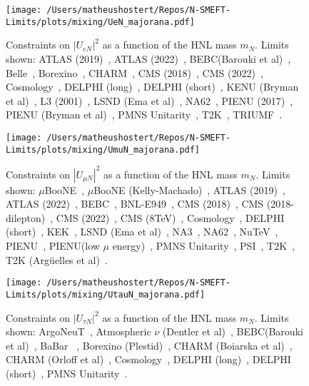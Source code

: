 \documentclass{revtex4-1}%
\begin{document}
%
\normalsize%


\begin{figure}[h!]%
\centering%
\texttt{[image: /Users/matheushostert/Repos/N-SMEFT-Limits/plots/mixing/UeN\_majorana.pdf]}%
\caption{Constraints on $|U_{e N}|^2$ as a function of the HNL mass $m_N$. Limits shown: ATLAS (2019)~\cite{ATLAS:2019kpx}, ATLAS (2022)~\cite{ATLAS:2022atq}, BEBC(Barouki et al)~\cite{Barouki:2022bkt}, Belle~\cite{Belle:2013ytx}, Borexino~\cite{Borexino:2013bot}, CHARM~\cite{CHARM:1985nku}, CMS (2018)~\cite{CMS:2018iaf}, CMS (2022)~\cite{CMS:2022fut}, Cosmology~\cite{Sabti:2020yrt}, DELPHI (long)~\cite{DELPHI:1996qcc}, DELPHI (short)~\cite{DELPHI:1996qcc}, KENU (Bryman et al)~\cite{Bryman:2019bjg}, L3 (2001)~\cite{L3:2001zfe}, LSND (Ema et al)~\cite{Ema:2023buz}, NA62~\cite{NA62:2020mcv}, PIENU (2017)~\cite{PIENU:2017wbj}, PIENU (Bryman et al)~\cite{Bryman:2019bjg}, PMNS Unitarity~\cite{Blennow:2023mqx}, T2K~\cite{T2K:2019jwa}, TRIUMF~\cite{Britton:1992xv}.}%
\end{figure}

%


\begin{figure}[h!]%
\centering%
\texttt{[image: /Users/matheushostert/Repos/N-SMEFT-Limits/plots/mixing/UmuN\_majorana.pdf]}%
\caption{Constraints on $|U_{\mu N}|^2$ as a function of the HNL mass $m_N$. Limits shown: $\mu$BooNE~\cite{MicroBooNE:2023icy}, $\mu$BooNE (Kelly-Machado)~\cite{Kelly:2021xbv}, ATLAS (2019)~\cite{ATLAS:2019kpx}, ATLAS (2022)~\cite{ATLAS:2022atq}, BEBC~\cite{WA66:1985mfx}, BNL-E949~\cite{E949:2014gsn}, CMS (2018)~\cite{CMS:2018iaf}, CMS (2018-dilepton)~\cite{CMS:2018jxx}, CMS (2022)~\cite{CMS:2022fut}, CMS (8TeV)~\cite{CMS:2016aro}, Cosmology~\cite{Sabti:2020yrt}, DELPHI (short)~\cite{DELPHI:1996qcc}, KEK~\cite{Bryman:2019bjg}, LSND (Ema et al)~\cite{Ema:2023buz}, NA3~\cite{NA3:1986ahv}, NA62~\cite{NA62:2021bji}, NuTeV~\cite{NuTeV:1999kej}, PIENU~\cite{PIENU:2019usb}, PIENU(low $\mu$ energy)~\cite{PIENU:2019usb}, PMNS Unitarity~\cite{Blennow:2023mqx}, PSI~\cite{Daum:1987bg}, T2K~\cite{T2K:2019jwa}, T2K (Arg\"uelles et al)~\cite{Arguelles:2021dqn}.}%
\end{figure}

%


\begin{figure}[h!]%
\centering%
\texttt{[image: /Users/matheushostert/Repos/N-SMEFT-Limits/plots/mixing/UtauN\_majorana.pdf]}%
\caption{Constraints on $|U_{\tau N}|^2$ as a function of the HNL mass $m_N$. Limits shown: ArgoNeuT~\cite{ArgoNeuT:2021clc}, Atmospheric $\nu$ (Dentler et al)~\cite{Dentler:2018sju}, BEBC(Barouki et al)~\cite{Barouki:2022bkt}, BaBar ~\cite{BaBar:2022cqj}, Borexino (Plestid)~\cite{Plestid:2020ssy}, CHARM (Boiarska et al)~\cite{Boiarska:2021yho}, CHARM (Orloff et al)~\cite{Orloff:2002de}, Cosmology~\cite{Sabti:2020yrt}, DELPHI (long)~\cite{DELPHI:1996qcc}, DELPHI (short)~\cite{DELPHI:1996qcc}, PMNS Unitarity~\cite{Blennow:2023mqx}.}%
\end{figure}

%
%
%
\end{document}
